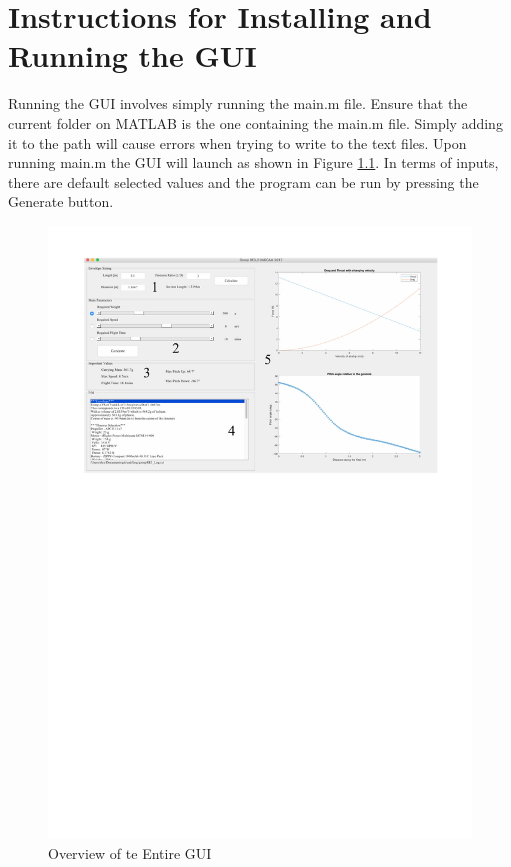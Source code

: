 \documentclass[../main.tex]{subfiles}
\begin{document}
\chapter{Instructions for Installing and Running the GUI} \label{appendix:GUI}

Running the GUI involves simply running the main.m file. Ensure that the current folder on MATLAB is the one containing the main.m file. Simply adding it to the path will cause errors when trying to write to the text files. Upon running main.m the GUI will launch as shown in Figure \ref{fig:gui}. In terms of inputs, there are default selected values and the program can be run by pressing the Generate button.

\begin{figure}[H]
	\centering
	\includegraphics[width=\linewidth]{img/gui/gui.pdf}
	\caption{Overview of te Entire GUI}
	\label{fig:gui}
\end{figure}
\end{document}
